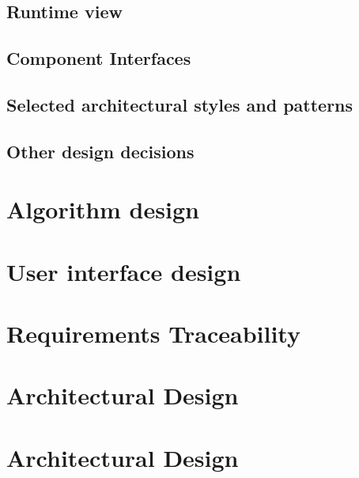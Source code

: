 \documentclass[openright]{report}
\begin{document}
	\chapter{Runtime view}
	    
	\chapter{Component Interfaces}
	    
	\chapter{Selected architectural styles and patterns}
	    
	\chapter{Other design decisions}
	    

    \part{Algorithm design}
    
    \part{User interface design}
    
    \part{Requirements Traceability}
    
    \part{Architectural Design}
    
    \part{Architectural Design}
    
\end{document}
